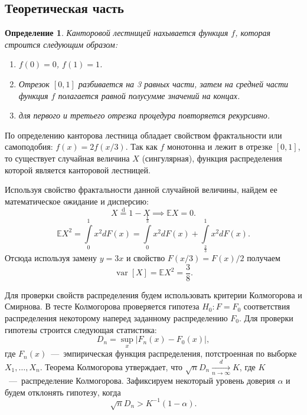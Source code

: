\documentclass[12pt, a4paper]{article} %
\newcommand\Eqtext[1]{\mathrel{\stackrel{\mathrm{\text{#1}}}=}}
\def\Expec{\mathbb{E}} %
\DeclareMathOperator{\var}{var}
\newtheorem{Def}{Определение}
\begin{document}
\subsection{Теоретическая часть}

\begin{Def}
    Канторовой лестницей нахывается функция $f$, которая строится следующим образом:
    \begin{enumerate}
        \item $f(0) = 0$,  $f(1) = 1$.
        \item Отрезок  $[0, 1]$ разбивается на 3 равных части, затем на 
            средней части функция  $f$ полагается равной полусумме значений на концах.
        \item для первого и третьего отрезка процедура повторяется рекурсивно.
    \end{enumerate} 
\end{Def} 

По определению канторова лестница обладает свойством фрактальности или самоподобия:
$f(x) = 2f(x / 3)$.
Так как  $f$ монотонна и лежит в отрезке  $[0, 1]$, то существует 
случайная величина $X$ (сингулярная), функция распределения которой является канторовой лестницей.

Используя свойство фрактальности данной случайной величины, найдем ее математическое ожидание и дисперсию:
\[
    X \Eqtext{d} 1 - X \implies \Expec X = 0.
\] 
\begin{equation*}
    \Expec X^2 = \int\limits_{0}^{1} x^2 dF(x) = 
    \int\limits_{0}^{\frac{1}{3}} x^2 dF(x) +
    \int\limits_{\frac{2}{3}}^{1}  x^2 dF(x).    
\end{equation*}
Отсюда используя замену $y = 3x$ и свойство $F(x / 3) = F(x) / 2$ получаем 
 \[
     \var\left[ X \right] = \Expec X^2 = \frac{3}{8}.
\] 

Для проверки свойств распределения будем использовать критерии Колмогорова и Смирнова.
В тесте Колмогорова проверяется гипотеза $H_0\colon F = F_0$ соответствия распределения некоторому наперед заданному распределению  $F_0$.
Для проверки гипотезы строится следующая статистика:
 \[
     D_n = \sup\limits_x \bigl\lvert F_n(x) - F_0(x) \bigr\rvert, 
\]
где $F_n(x)$~---~эмпирическая функция распределения, потстроенная по выборке  $X_1, \ldots, X_n$.
Теорема Колмогорова утверждает, что $\sqrt{n}D_n \xrightarrow[n \rightarrow \infty]{d} K$, 
где  $K$~---~распределение Колмогорова.
Зафиксируем некоторый уровень доверия  $\alpha$ и будем отклонять гипотезу, когда
\[
    \sqrt{n} D_n > K^{-1}(1 - \alpha).
\] 
\end{document}
